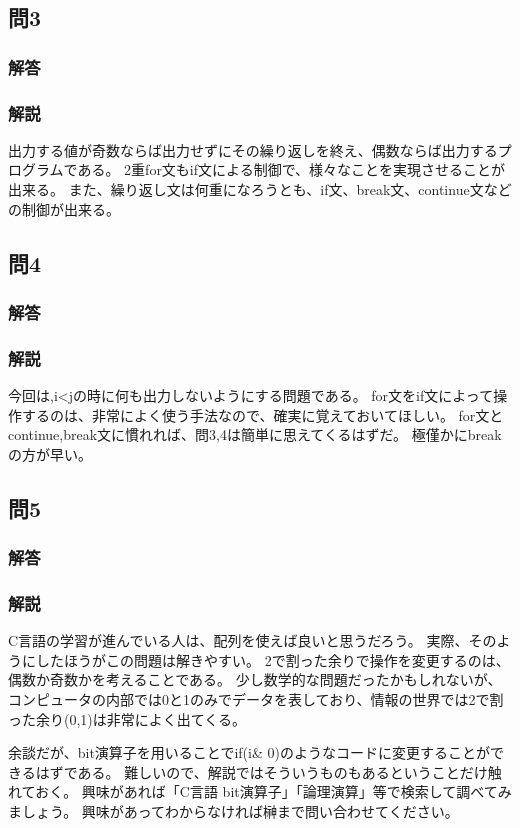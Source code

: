 \subsection{問3}
\subsubsection{解答}

\subsubsection{解説}
出力する値が奇数ならば出力せずにその繰り返しを終え、偶数ならば出力するプログラムである。
2重for文もif文による制御で、様々なことを実現させることが出来る。
また、繰り返し文は何重になろうとも、if文、break文、continue文などの制御が出来る。


\subsection{問4}
\subsubsection{解答}

\subsubsection{解説}
今回は,i<jの時に何も出力しないようにする問題である。
for文をif文によって操作するのは、非常によく使う手法なので、確実に覚えておいてほしい。
for文とcontinue,break文に慣れれば、問3,4は簡単に思えてくるはずだ。
極僅かにbreakの方が早い。


\subsection{問5}
\subsubsection{解答}

\subsubsection{解説}
C言語の学習が進んでいる人は、配列を使えば良いと思うだろう。
実際、そのようにしたほうがこの問題は解きやすい。
2で割った余りで操作を変更するのは、偶数か奇数かを考えることである。
少し数学的な問題だったかもしれないが、コンピュータの内部では0と1のみでデータを表しており、情報の世界では2で割った余り(0,1)は非常によく出てくる。

余談だが、bit演算子を用いることでif(i\& 0)のようなコードに変更することができるはずである。
難しいので、解説ではそういうものもあるということだけ触れておく。
興味があれば「C言語 bit演算子」「論理演算」等で検索して調べてみましょう。
興味があってわからなければ榊まで問い合わせてください。

